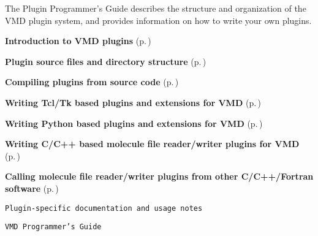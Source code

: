 



 The Plugin Programmer's Guide describes the structure and organization of the  VMD plugin system, and provides information on how to write your own plugins.

\begin{CompactItemize}
\item 
 {\bf Introduction to VMD plugins} {\rm (p.\,\pageref{intro})} \item 
 {\bf Plugin source files and directory structure} {\rm (p.\,\pageref{filestruct})} \item 
 {\bf Compiling plugins from source code} {\rm (p.\,\pageref{compiling})} \item 
 {\bf Writing Tcl/Tk based plugins and extensions for VMD} {\rm (p.\,\pageref{tcltkplugins})} \item 
 {\bf Writing Python based plugins and extensions for VMD} {\rm (p.\,\pageref{pythonplugins})} \item 
 {\bf Writing C/C++ based molecule file reader/writer plugins for VMD} {\rm (p.\,\pageref{molfileplugins})} \item 
 {\bf Calling molecule file reader/writer plugins from other C/C++/Fortran software} {\rm (p.\,\pageref{callmolfileplugins})} \item 
{\tt Plugin-specific documentation and usage notes}  \item 
{\tt VMD Programmer's Guide} \end{CompactItemize}
